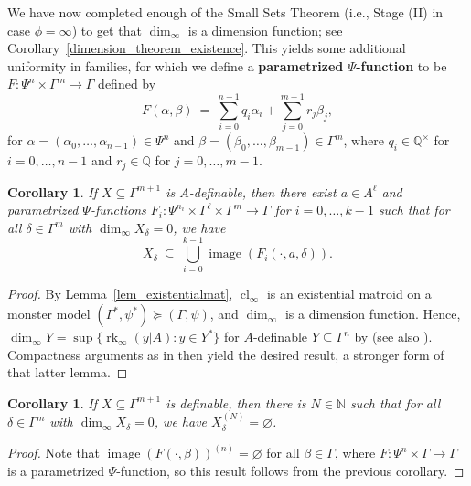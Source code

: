 \documentclass[11pt]{amsart}
\theoremstyle{plain}
\newtheorem{cor}[thm]{Corollary}
\theoremstyle{definition}
\numberwithin{equation}{section}
\newcommand\N{\mathbb{N}}
\newcommand\Q{\mathbb{Q}}
\newcommand\0{\varnothing}
\DeclareMathOperator\image{image}
\DeclareMathOperator\cl{cl}
\DeclareMathOperator\rk{rk}
\begin{document}
\noindent
We have now completed enough of the Small Sets Theorem (i.e., Stage (II) in case $\phi=\infty$) to get that $\dim_{\infty}$ is a dimension function; see Corollary~\ref{dimension_theorem_existence}. 
This yields some additional uniformity in families, for which we define a \textbf{parametrized $\Psi$-function} to be $F \colon \Psi^n \times \Gamma^m \to \Gamma$ defined by
\[
F(\alpha,\beta)\ =\ \sum_{i=0}^{n-1} q_i\alpha_i + \sum_{j=0}^{m-1} r_j\beta_j,
\]
for $\alpha=(\alpha_0,\dots,\alpha_{n-1})\in\Psi^n$ and $\beta=(\beta_0,\dots,\beta_{m-1})\in\Gamma^m$, where $q_i\in \Q^{\times}$ for $i=0,\dots,n-1$ and $r_j\in \Q$ for $j=0,\dots,m-1$.
\begin{cor}\label{cor_dimfibre}
If $X \subseteq \Gamma^{m+1}$ is $A$-definable, then there exist $a \in A^{\ell}$ and parametrized $\Psi$-functions $F_i \colon \Psi^{n_i}\times\Gamma^\ell\times\Gamma^m \to \Gamma$ for $i=0,\dots,k-1$ such that for all $\delta\in\Gamma^{m}$ with $\dim_{\infty} X_{\delta}=0$, we have
\[
X_{\delta}\ \subseteq\ \bigcup_{i=0}^{k-1} \image(F_i(\cdot,a,\delta)).
\]
\end{cor}
\begin{proof}
By Lemma~\ref{lem_existentialmat}, $\cl_{\infty}$ is an existential matroid on a monster model $(\Gamma^*,\psi^*) \succcurlyeq (\Gamma,\psi)$, and $\dim_{\infty}$ is a dimension function.
Hence, $\dim_{\infty}Y=\sup\{ \rk_{\infty}(y|A) : y \in Y^* \}$ for $A$-definable $Y\subseteq \Gamma^n$ by \cite[Theorem~4.3 and Remark~3.45]{fornasiero-dimmatroiddense} (see also \cite[Definition~3.29]{fornasiero-dimmatroiddense}).
Compactness arguments as in \cite[Lemmas~2.3 and 2.7]{angel2016bounded} then yield the desired result, a stronger form of that latter lemma.
\end{proof}

\begin{cor}
If $X \subseteq \Gamma^{m+1}$ is definable, then there is $N \in \N$ such that for all $\delta\in\Gamma^{m}$ with $\dim_{\infty} X_{\delta}=0$, we have $X_{\delta}^{(N)}=\0$.
\end{cor}
\begin{proof}
Note that $\image(F(\cdot,\beta))^{(n)}=\0$ for all $\beta\in\Gamma$, where $F\colon \Psi^n \times \Gamma \to \Gamma$ is a parametrized $\Psi$-function, so this result follows from the previous corollary.
\end{proof}
\end{document}
